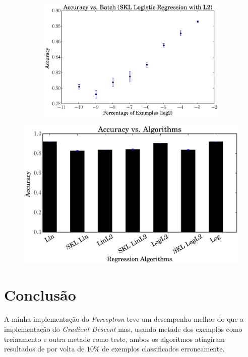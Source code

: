 \documentclass[a4paper, 12pt]{article}
\begin{document}
\begin{figure}[htpb]
\begin{subfigure}[htpb]{0.45\textwidth}
        \includegraphics[width=\textwidth]{acc_vs_batchp_skl_logregL2}
        \caption{}
        \label{fig:gwd}
    \end{subfigure}
    \caption{}\label{fig:viz}
\end{figure}

\begin{figure}[htpb]
    \centering
    \includegraphics[width=.8\textwidth]{acc_vs_algorithm}
    \caption{}
    \label{fig:snt}
\end{figure}

\section{Conclusão} \label{sec:concl}

A minha implementação do \textit{Perceptron} teve um desempenho melhor do que a
implementação do \textit{Gradient Descent} mas, usando metade dos exemplos como
treinamento e outra metade como teste, ambos os algoritmos atingiram resultados
de por volta de $10\%$ de exemplos classificados erroneamente.
\end{document}
